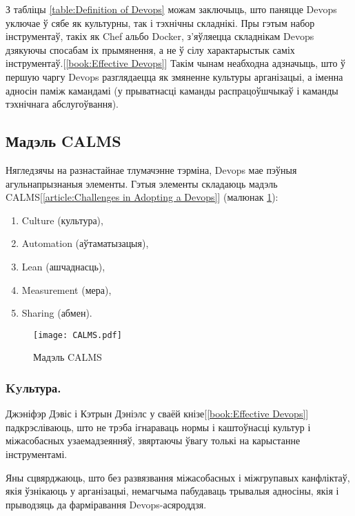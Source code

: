 З табліцы \ref{table:Definition of Devops} можам заключыць,
што паняцце Devops уключае ў сябе як культурны, так і
тэхнічны складнікі.
Пры гэтым набор інструментаў, такіх як Chef альбо Docker,
з'яўляецца складнікам Devops дзякуючы спосабам іх прымянення,
а не ў сілу характарыстык саміх інструментаў.[\ref{book:Effective Devops}]
Такім чынам неабходна адзначыць, што ў першую чаргу Devops разглядаецца
як змяненне культуры арганізацыі,
а іменна адносін паміж камандамі (у прыватнасці каманды распрацоўшчыкаў і
каманды тэхнічнага абслугоўвання).

\subsection{Мадэль CALMS}

Нягледзячы на разнастайнае тлумачэнне тэрміна, Devops мае
пэўныя агульнапрызнаныя элементы.
Гэтыя элементы складаюць мадэль CALMS[\ref{article:Challenges in Adopting a Devops}]
(малюнак \ref{figure:CALMS model}):
\begin{enumerate}
    \item Culture (культура),
    \item Automation (аўтаматызацыя),
    \item Lean (ашчаднасць),
    \item Measurement (мера),
    \item Sharing (абмен).
\end{enumerate}

\begin{figure}[h!]
    \texttt{[image: CALMS.pdf]}
    \caption{Мадэль CALMS}
    \label{figure:CALMS model}
\end{figure}

\vspace{-\baselineskip}
\subsubsection{Kyльтура.}

Джэніфэр Дэвіс і Кэтрын Дэніэлс у сваёй кнізе[\ref{book:Effective Devops}]
падкрэсліваюць, што не трэба ігнараваць нормы і каштоўнасці
культур і міжасобасных узаемадзеянняў, звяртаючы ўвагу толькі
на карыстанне інструментамі.

Яны сцвярджаюць, што без развязвання міжасобасных і
міжгрупавых канфліктаў, якія ўзнікаюць у арганізацыі,
немагчыма пабудаваць трывалыя адносіны, якія і прыводзяць
да фар\-мі\-ра\-ван\-ня Devops-асяроддзя.


